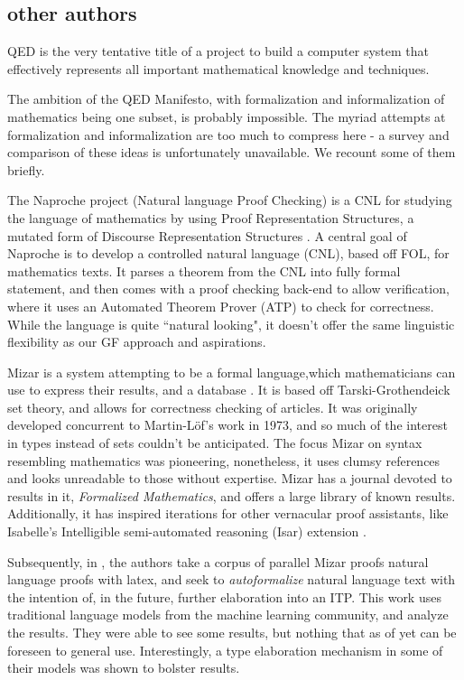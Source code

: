 \subsection{other authors}

\begin{displayquote}
QED is the very tentative title of a project to build a computer system that effectively represents all important mathematical knowledge and techniques.
\cite{godel1994qed} 
\end{displayquote}

The ambition of the QED Manifesto, with formalization and informalization of
mathematics being one subset, is probably impossible. The myriad attempts
at formalization and informalization are too much to compress here - a survey
and comparison of these ideas is unfortunately unavailable. We recount some of
them briefly.

The Naproche project (Natural language Proof Checking) is a CNL for studying the
language of mathematics by using Proof Representation Structures, a mutated form
of Discourse Representation Structures \cite{cramer2009naproche}. A central
goal of Naproche is to develop a controlled natural language (CNL), based off FOL, for
mathematics texts. It parses a theorem from the CNL into fully formal
statement, and then comes with a proof checking back-end to allow verification,
where it uses an Automated Theorem Prover (ATP) to check for correctness.
While the language is quite ``natural looking", it doesn't offer the same
linguistic flexibility as our GF approach and aspirations.

Mizar is a system attempting to be a formal language,which mathematicians can
use to express their results, and a database \cite{rudnicki1992overview}. It is
based off Tarski-Grothendeick set theory, and allows for correctness checking of
articles. It was originally developed concurrent to Martin-Löf's work in 1973,
and so much of the interest in types instead of sets couldn't be anticipated.
The focus Mizar on syntax resembling mathematics was pioneering, nonetheless, it
uses clumsy references and looks unreadable to those without expertise. Mizar
has a journal devoted to results in it, \emph{Formalized Mathematics}, and
offers a large library of known results. Additionally, it has inspired
iterations for other vernacular proof assistants, like Isabelle's Intelligible semi-automated
reasoning (Isar) extension \cite{wenzel2004isabelle}.

Subsequently, in \cite{mlTrans}, the authors take a corpus of parallel Mizar proofs natural
language proofs with latex, and seek to \emph{autoformalize} natural language
text with the intention of, in the future, further elaboration into an ITP.
This work uses traditional language models from the machine learning community, and analyze
the results. They were able to see some results, but nothing that as of yet can
be foreseen to general use.  Interestingly, a type elaboration mechanism in some
of their models was shown to bolster results.

